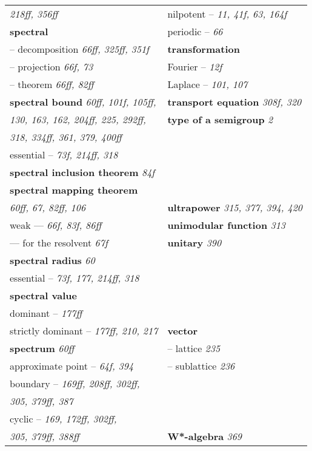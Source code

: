 \documentclass{article}
\begin{document}
\begin{longtable}{p{}p{}}
\quad\quad \textit{218ff, 356ff} & \quad nilpotent -- \textit{11, 41f, 63, 164f} \\
\textbf{spectral} & \quad periodic -- \textit{66} \\
\quad -- decomposition \textit{66ff, 325ff, 351f} & \textbf{transformation} \\
\quad -- projection \textit{66f, 73} & \quad Fourier -- \textit{12f} \\
\quad -- theorem \textit{66ff, 82ff} & \quad Laplace -- \textit{101, 107} \\
\textbf{spectral bound} \textit{60ff, 101f, 105ff,} & \textbf{transport equation} \textit{308f, 320} \\
\quad \textit{130, 163, 162, 204ff, 225, 292ff,} & \textbf{type of a semigroup} \textit{2} \\
\quad \textit{318, 334ff, 361, 379, 400ff} & \\
\quad essential -- \textit{73f, 214ff, 318} & \\
\textbf{spectral inclusion theorem} \textit{84f} & \\
\textbf{spectral mapping theorem} & \\
\quad \textit{60ff, 67, 82ff, 106} & \textbf{ultrapower} \textit{315, 377, 394, 420} \\
\quad weak --- \textit{66f, 83f, 86ff} & \textbf{unimodular function} \textit{313} \\
\quad --- for the resolvent \textit{67f} & \textbf{unitary} \textit{390} \\
\textbf{spectral radius} \textit{60} & \\
\quad essential -- \textit{73f, 177, 214ff, 318} & \\
\textbf{spectral value} & \\
\quad dominant -- \textit{177ff} & \\
\quad strictly dominant -- \textit{177ff, 210, 217} & \textbf{vector} \\
\textbf{spectrum} \textit{60ff} & \quad -- lattice \textit{235} \\
\quad approximate point -- \textit{64f, 394} & \quad -- sublattice \textit{236} \\
\quad boundary -- \textit{169ff, 208ff, 302ff,} & \\
\quad\quad \textit{305, 379ff, 387} & \\
\quad cyclic -- \textit{169, 172ff, 302ff,} & \\
\quad\quad \textit{305, 379ff, 388ff} & \textbf{W*-algebra} \textit{369} \\

\end{longtable}
\end{document}
